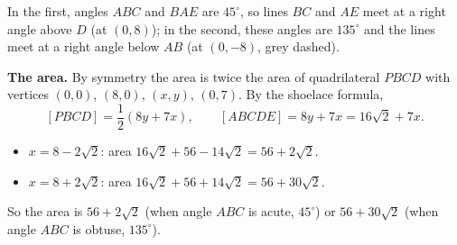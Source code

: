 In the first, angles $ABC$ and $BAE$ are $45^\circ$, so lines $BC$ and $AE$ meet at a right angle above $D$ (at $(0,8)$); in the second, these angles are $135^\circ$ and the lines meet at a right angle below $AB$ (at $(0,-8)$, grey dashed).

\textbf{The area.} By symmetry the area is twice the area of quadrilateral $PBCD$ with vertices $(0,0)$, $(8,0)$, $(x,y)$, $(0,7)$. By the shoelace formula,
\[
[PBCD]=\dfrac{1}{2}\left(8y+7x\right),\qquad [ABCDE]=8y+7x=16\sqrt2+7x .
\]
\begin{itemize}
\item $x=8-2\sqrt2$: area $16\sqrt2+56-14\sqrt2=56+2\sqrt2$.
\item $x=8+2\sqrt2$: area $16\sqrt2+56+14\sqrt2=56+30\sqrt2$.
\end{itemize}
So the area is $\boxed{56+2\sqrt2}$ (when angle $ABC$ is acute, $45^\circ$) or $\boxed{56+30\sqrt2}$ (when angle $ABC$ is obtuse, $135^\circ$).
